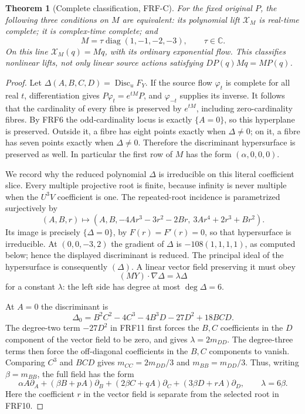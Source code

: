 \documentclass[11pt]{article}
\newtheorem{theorem}{Theorem}
\newcommand{\C}{\mathbb C}
\newcommand{\diag}{\operatorname{diag}}
\newcommand{\Disc}{\operatorname{Disc}}
\begin{document}
\begin{theorem}[Complete classification, FRF-C]\label{thm:complete}
For the fixed original $P$, the following three conditions on $M$ are equivalent:
its polynomial lift $\mathcal X_M$ is real-time complete; it is complex-time
complete; and
\[
 M=\tau\diag(1,-1,-2,-3),\qquad \tau\in\C.\tag{FRF9}
\]
On this line $\mathcal X_M(q)=Mq$, with its ordinary exponential flow.
This classifies nonlinear lifts, not only linear source actions satisfying
$DP(q)Mq=MP(q)$.
\end{theorem}
\begin{proof}
Let $\Delta(A,B,C,D)=\Disc_uF_Y$. If the source flow $\varphi_t$ is complete
for all real $t$, differentiation gives
$P\varphi_t=e^{tM}P$, and $\varphi_{-t}$ supplies its inverse. It follows
that the cardinality of every fibre is preserved by $e^{tM}$, including
zero-cardinality fibres. By FRF6 the odd-cardinality locus is exactly
$\{A=0\}$, so this hyperplane is preserved. Outside it, a fibre has eight
points exactly when $\Delta\ne0$; on it, a fibre has seven points exactly
when $\Delta\ne0$. Therefore the discriminant hypersurface is preserved
as well. In particular the first row of $M$ has the form $(\alpha,0,0,0)$.

We record why the reduced polynomial $\Delta$ is irreducible on this
literal coefficient slice. Every multiple projective root is finite,
because infinity is never multiple when the $U^3V$ coefficient is one.
The repeated-root incidence is parametrized surjectively by
\[
 (A,B,r)\longmapsto
 (A,B,-4Ar^3-3r^2-2Br,\ 3Ar^4+2r^3+Br^2).\tag{FRF10}
\]
Its image is precisely $\{\Delta=0\}$, by $F(r)=F'(r)=0$, so that
hypersurface is irreducible. At $(0,0,-3,2)$ the gradient of $\Delta$ is
$-108(1,1,1,1)$, as computed below; hence the displayed discriminant is
reduced. The principal ideal of the hypersurface is consequently $(\Delta)$.
A linear vector field preserving it must obey
\[
 (MY)\cdot\nabla\Delta=\lambda\Delta\tag{FRF11}
\]
for a constant $\lambda$: the left side has degree at most $\deg\Delta=6$.

At $A=0$ the discriminant is
\[
 \Delta_0=B^2C^2-4C^3-4B^3D-27D^2+18BCD.\tag{FRF12}
\]
The degree-two term $-27D^2$ in FRF11 first forces the $B,C$ coefficients
in the $D$ component of the vector field to be zero, and gives
$\lambda=2m_{DD}$. The degree-three terms then force the off-diagonal
coefficients in the $B,C$ components to vanish. Comparing $C^3$ and $BCD$
gives $m_{CC}=2m_{DD}/3$ and $m_{BB}=m_{DD}/3$.
Thus, writing $\beta=m_{BB}$, the full field has the form
\[
 \alpha A\partial_A+(\beta B+pA)\partial_B
 +(2\beta C+qA)\partial_C+(3\beta D+rA)\partial_D,
 \qquad \lambda=6\beta.\tag{FRF13}
\]
Here the coefficient $r$ in the vector field is separate from the selected
root in FRF10.


\end{proof}
\end{document}
